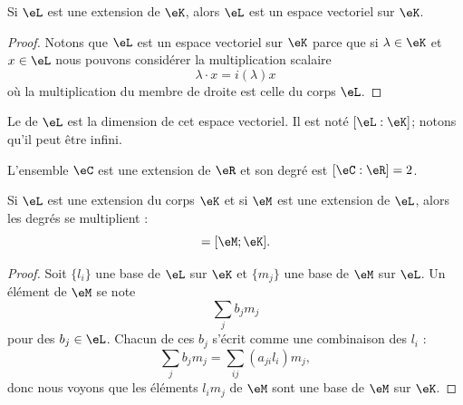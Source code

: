 \begin{lemma}
    Si \( \eL\) est une extension de \( \eK\), alors \( \eL\) est un espace vectoriel sur \( \eK\).
\end{lemma}

\begin{proof}
    Notons que \( \eL\) est un espace vectoriel sur \( \eK\) parce que si \( \lambda\in \eK\) et \( x\in \eL\) nous pouvons considérer la multiplication scalaire
    \begin{equation}
        \lambda\cdot x=i(\lambda)x
    \end{equation}
    où la multiplication du membre de droite est celle du corps \( \eL\). 
\end{proof}

\begin{definition}      \label{DefUYiyieu}
    Le  de \( \eL\) est la dimension de cet espace vectoriel. Il est noté \( [\eL:\eK]\); notons qu'il peut être infini.
\end{definition}

\begin{example}
    L'ensemble \( \eC\) est une extension de \( \eR\) et son degré est \( [\eC:\eR]=2\).
\end{example}

\begin{proposition}     \label{PropGWazMpY}
    Si \( \eL\) est une extension du corps \( \eK\) et si \( \eM\) est une extension de \( \eL\), alors les degrés se multiplient :
    \begin{equation}
        [\eM:\eL][\eL:\eK]=[\eM;\eK].
    \end{equation}
\end{proposition}

\begin{proof}
    Soit \( \{ l_i \}\) une base de \( \eL\) sur \( \eK\) et \( \{ m_j \}\) une base de \( \eM\) sur \( \eL\). Un élément de \( \eM\) se note
    \begin{equation}
        \sum_{j}b_jm_j
    \end{equation}
    pour des \( b_j\in \eL\). Chacun de ces \( b_j\) s'écrit comme une combinaison des \( l_i\) :
    \begin{equation}
        \sum_{j}b_jm_j=\sum_{ij}(a_{ji}l_i)m_j,
    \end{equation}
    donc nous voyons que les éléments \( l_im_j\) de \( \eM\) sont une base de \( \eM\) sur \( \eK\).
\end{proof}

